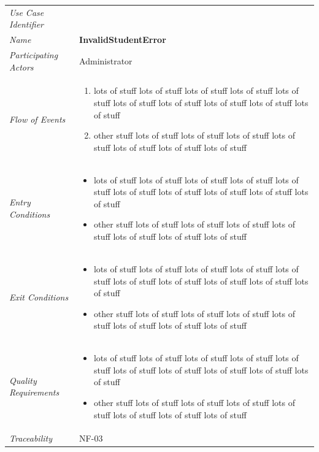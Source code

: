 \documentclass[12pt,letterpaper]{article}
\begin{document}
\begin{center}
	\begin{tabu} to 
		\toprule
		Use Case Identifier & \invalidstudenterror{} \\
		Name & {\bf InvalidStudentError} \\
		Participating Actors & Administrator \\
		Flow of Events & 
	    \begin{enumerate}[topsep=-1em]
		    \item lots of stuff lots of stuff lots of stuff lots of stuff lots of stuff lots of stuff lots of stuff lots of stuff lots of stuff lots of stuff
		    \item other stuff lots of stuff lots of stuff lots of stuff lots of stuff lots of stuff lots of stuff lots of stuff
		\end{enumerate} \\

		Entry Conditions &
		\begin{itemize}[topsep=-1em]
		    \item lots of stuff lots of stuff lots of stuff lots of stuff lots of stuff lots of stuff lots of stuff lots of stuff lots of stuff lots of stuff
		    \item other stuff lots of stuff lots of stuff lots of stuff lots of stuff lots of stuff lots of stuff lots of stuff
        \end{itemize} \\

		Exit Conditions &
		\begin{itemize}[topsep=-1em]
		    \item lots of stuff lots of stuff lots of stuff lots of stuff lots of stuff lots of stuff lots of stuff lots of stuff lots of stuff lots of stuff
		    \item other stuff lots of stuff lots of stuff lots of stuff lots of stuff lots of stuff lots of stuff lots of stuff
        \end{itemize} \\

		Quality Requirements &
		\begin{itemize}[topsep=-1em]
		    \item lots of stuff lots of stuff lots of stuff lots of stuff lots of stuff lots of stuff lots of stuff lots of stuff lots of stuff lots of stuff
		    \item other stuff lots of stuff lots of stuff lots of stuff lots of stuff lots of stuff lots of stuff lots of stuff
        \end{itemize} \\

		Traceability & NF-03 \\
		\toprule
	\end{tabu}
\end{center}
\end{document}
